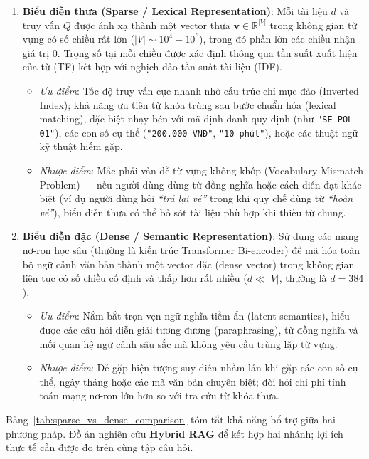 \begin{enumerate}[nosep]
  \item \textbf{Biểu diễn thưa (Sparse / Lexical Representation)}:
  Mỗi tài liệu $d$ và truy vấn $Q$ được ánh xạ thành một vector thưa $\mathbf{v} \in \mathbb{R}^{|V|}$ trong không gian từ vựng có số chiều rất lớn ($|V| \sim 10^4 - 10^6$), trong đó phần lớn các chiều nhận giá trị 0. Trọng số tại mỗi chiều được xác định thông qua tần suất xuất hiện của từ (TF) kết hợp với nghịch đảo tần suất tài liệu (IDF).
  \begin{itemize}[nosep]
    \item \textit{Ưu điểm}: Tốc độ truy vấn cực nhanh nhờ cấu trúc chỉ mục đảo (Inverted Index); khả năng ưu tiên từ khóa trùng sau bước chuẩn hóa (lexical matching), đặc biệt nhạy bén với mã định danh quy định (như \texttt{"SE-POL-01"}), các con số cụ thể (\texttt{"200.000 VNĐ"}, \texttt{"10 phút"}), hoặc các thuật ngữ kỹ thuật hiếm gặp.
    \item \textit{Nhược điểm}: Mắc phải vấn đề từ vựng không khớp (Vocabulary Mismatch Problem) --- nếu người dùng dùng từ đồng nghĩa hoặc cách diễn đạt khác biệt (ví dụ người dùng hỏi \textit{``trả lại vé''} trong khi quy chế dùng từ \textit{``hoàn vé''}), biểu diễn thưa có thể bỏ sót tài liệu phù hợp khi thiếu từ chung.
  \end{itemize}

  \item \textbf{Biểu diễn đặc (Dense / Semantic Representation)}:
  Sử dụng các mạng nơ-ron học sâu (thường là kiến trúc Transformer Bi-encoder) để mã hóa toàn bộ ngữ cảnh văn bản thành một vector đặc (dense vector) trong không gian liên tục có số chiều cố định và thấp hơn rất nhiều ($d \ll |V|$, thường là $d = 384$).
  \begin{itemize}[nosep]
    \item \textit{Ưu điểm}: Nắm bắt trọn vẹn ngữ nghĩa tiềm ẩn (latent semantics), hiểu được các câu hỏi diễn giải tương đương (paraphrasing), từ đồng nghĩa và mối quan hệ ngữ cảnh sâu sắc mà không yêu cầu trùng lặp từ vựng.
    \item \textit{Nhược điểm}: Dễ gặp hiện tượng suy diễn nhầm lẫn khi gặp các con số cụ thể, ngày tháng hoặc các mã văn bản chuyên biệt; đòi hỏi chi phí tính toán mạng nơ-ron lớn hơn so với tra cứu từ khóa thưa.
  \end{itemize}
\end{enumerate}

Bảng~\ref{tab:sparse_vs_dense_comparison} tóm tắt khả năng bổ trợ giữa hai phương pháp. Đồ án nghiên cứu \textbf{Hybrid RAG} để kết hợp hai nhánh; lợi ích thực tế cần được đo trên cùng tập câu hỏi.


